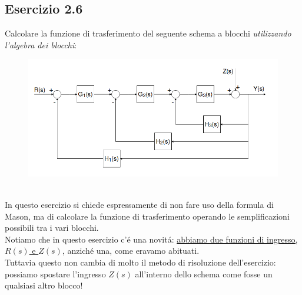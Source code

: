 \documentclass[12pt,a4paper]{article}
\begin{document}
	\subsection*{Esercizio 2.6} Calcolare la funzione di trasferimento del seguente schema a blocchi \textit{utilizzando l'algebra dei blocchi}:
	\begin{figure}[h!]
		\centering
		\includegraphics[scale=0.5]{./images/schema26.png}
	\end{figure}
	\\ In questo esercizio si chiede espressamente di non fare uso della formula di Mason, ma di calcolare la funzione di trasferimento operando le semplificazioni possibili tra i vari blocchi.\\
	Notiamo che in questo esercizio c'\'e una novit\'a: \underline{abbiamo due funzioni di ingresso, $R(s)$ e $Z(s)$}, anzich\'e una, come eravamo abituati.\\
	Tuttavia questo non cambia di molto il metodo di risoluzione dell'esercizio: possiamo spostare l'ingresso $Z(s)$ all'interno dello schema come fosse un qualsiasi altro blocco!
\end{document}
